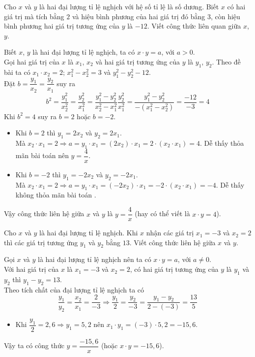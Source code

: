 \begin{vd}%
Cho $x$ và $y$ là hai đại lượng tỉ lệ nghịch với hệ số tỉ lệ là số dương. Biết $x$ có hai giá trị mà tích bằng $2$ và hiệu bình phương của hai giá trị đó bằng $3$, còn hiệu bình phương hai giá trị  tương ứng của $y$ là $-12$. Viết công thức liên quan giữa $x$, $y$.
\loigiai
	{Biết $x$, $y$ là hai đại lượng tỉ lệ nghịch, ta có $x\cdot  y = a$, với $a > 0$.\\
	Gọi hai giá trị của $x$ là $x_{1}$, $x_{2}$ và hai giá trị tương ứng của $y$ là $y_{1}$, $y_{2}$.
	Theo đề bài ta có $x_{1}\cdot x_{2} = 2$;  $x^2_{1} - x^2_{2} = 3$ và $y^2_{1} - y^2_{2} - 12$.\\
	Đặt  $b = \dfrac{y_{1}}{x_{2}} =  \dfrac{y_{2}}{x_{1}}$ suy ra
		$$b^2 = \dfrac{y^2_{1}}{x^2_{2}} = \dfrac{y^2_{2}}{x^2_{1}} = \dfrac{y^2_{1} - y^2_{2}}{x^2_{2} - x^2_{1}}\dfrac{y^2_{2}}{x^2_{1}} = \dfrac{y^2_{1} - y^2_{2}}{- \left(x^2_{1} - x^2_{2}\right)} = \dfrac{- 12}{- 3} = 4$$ 
		Khi $b^2  = 4$ suy ra $b = 2$ hoặc $b = - 2$.\\
		\begin{itemize}
			\item Khi $b = 2$ thì $y_{1} = 2x_{2}$ và  $y_{2} = 2x_{1}$.\\
			Mà $x_{2}\cdot x_{1} = 2\Rightarrow a = y_{1}\cdot x_{1} = \left(2x_{2}\right)\cdot x_{1} = 2\cdot\left(x_{2}\cdot x_{1}\right) = 4$. Dễ thấy thỏa mãn bài toán nên $y = \dfrac{4}{x}$.
			\item Khi $b = - 2$ thì $y_{1} = - 2x_{2}$ và  $y_{2} = - 2x_{1}$.\\
			Mà $x_{2}\cdot x_{1} = 2\Rightarrow a = y_{1}\cdot x_{1} = \left(- 2x_{2}\right)\cdot x_{1} = - 2\cdot\left(x_{2}\cdot x_{1}\right) = - 4$. Dễ thấy không thỏa mãn bài toán .
		\end{itemize}
		Vậy công thức liên hệ giữa $x$ và $y$ là $y = \dfrac{4}{x}$ (hay có thể viết là $x\cdot y = 4$).
	}
\end{vd}


\begin{vd}%
Cho $x$ và $y$ là hai đại lượng tỉ lệ nghịch. Khi $x$ nhận các giá trị $x_{1} = - 3$ và $x_{2} = 2$ thì các giá trị tương ứng $y_{1}$ và $y_{2}$ bằng $13$. Viết công thức liên hệ giữa $x$ và $y$. 
	\loigiai
	{Gọi $x$ và $y$ là hai đại lượng tỉ lệ nghịch nên ta có $x\cdot y = a$, với $a\neq 0$.\\
	Với hai giá trị của $x$ là $x_{1} = - 3$ và $x_{2} = 2$, có hai giá trị tương ứng của $y$ là $y_{1}$ và $y_{2}$ thì $y_{1}- y_{2} = 13$.\\
	Theo tích chất của đại lượng tỉ lệ nghịch ta có 
	$$\dfrac{y_{1}}{y_{2}} = \dfrac{x_{2}}{x_{1}}= \dfrac{2}{- 3}\Rightarrow \dfrac{y_{1}}{2} = \dfrac{y_{2}}{- 3 } = \dfrac{y_{1} - y_{2}}{2 - (- 3)} = \dfrac{13}{5}$$
		\begin{itemize}
			\item Khi $\dfrac{y_{1}}{2}= 2{,}6\Rightarrow y_{1} = 5{,}2$ nên $x_{1}\cdot y_{1} = (- 3)\cdot 5{,}2 = - 15{,}6$.
		\end{itemize}
		Vậy ta có công thức $y = \dfrac{- 15{,}6}{x}$ (hoặc $x\cdot y = - 15{,}6$).
	}
\end{vd}



